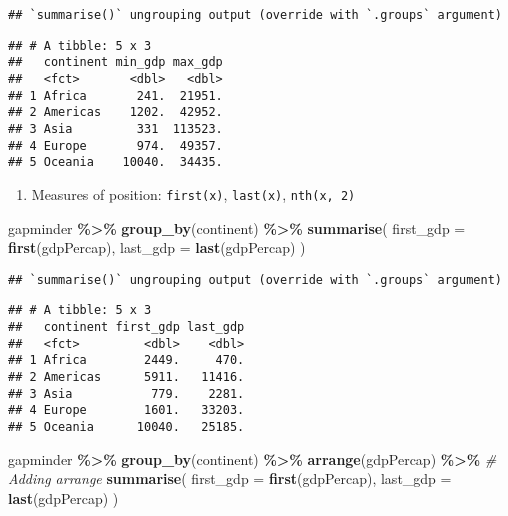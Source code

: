 \documentclass[
]{book}
\newenvironment{Shaded}{\begin{snugshade}}{\end{snugshade}}
\newcommand{\CommentTok}[1]{\textcolor[rgb]{0.56,0.35,0.01}{\textit{#1}}}
\newcommand{\DataTypeTok}[1]{\textcolor[rgb]{0.13,0.29,0.53}{#1}}
\newcommand{\KeywordTok}[1]{\textcolor[rgb]{0.13,0.29,0.53}{\textbf{#1}}}
\newcommand{\NormalTok}[1]{#1}
\newcommand{\OperatorTok}[1]{\textcolor[rgb]{0.81,0.36,0.00}{\textbf{#1}}}
\newcommand{\StringTok}[1]{\textcolor[rgb]{0.31,0.60,0.02}{#1}}
\providecommand{\tightlist}{%
  \setlength{\itemsep}{0pt}\setlength{\parskip}{0pt}}
\begin{document}
\begin{verbatim}
## `summarise()` ungrouping output (override with `.groups` argument)
\end{verbatim}

\begin{verbatim}
## # A tibble: 5 x 3
##   continent min_gdp max_gdp
##   <fct>       <dbl>   <dbl>
## 1 Africa       241.  21951.
## 2 Americas    1202.  42952.
## 3 Asia         331  113523.
## 4 Europe       974.  49357.
## 5 Oceania    10040.  34435.
\end{verbatim}

\begin{enumerate}
\def\labelenumi{\arabic{enumi}.}
\setcounter{enumi}{2}
\tightlist
\item
  Measures of position: \texttt{first(x)}, \texttt{last(x)}, \texttt{nth(x,\ 2)}
\end{enumerate}

\begin{Shaded}
\begin{Highlighting}[]
\NormalTok{gapminder }\OperatorTok{\%\textgreater{}\%}
\StringTok{  }\KeywordTok{group\_by}\NormalTok{(continent) }\OperatorTok{\%\textgreater{}\%}
\StringTok{  }\KeywordTok{summarise}\NormalTok{(}
    \DataTypeTok{first\_gdp =} \KeywordTok{first}\NormalTok{(gdpPercap),}
    \DataTypeTok{last\_gdp =} \KeywordTok{last}\NormalTok{(gdpPercap)}
\NormalTok{  )}
\end{Highlighting}
\end{Shaded}

\begin{verbatim}
## `summarise()` ungrouping output (override with `.groups` argument)
\end{verbatim}

\begin{verbatim}
## # A tibble: 5 x 3
##   continent first_gdp last_gdp
##   <fct>         <dbl>    <dbl>
## 1 Africa        2449.     470.
## 2 Americas      5911.   11416.
## 3 Asia           779.    2281.
## 4 Europe        1601.   33203.
## 5 Oceania      10040.   25185.
\end{verbatim}

\begin{Shaded}
\begin{Highlighting}[]
\NormalTok{gapminder }\OperatorTok{\%\textgreater{}\%}
\StringTok{  }\KeywordTok{group\_by}\NormalTok{(continent) }\OperatorTok{\%\textgreater{}\%}
\StringTok{  }\KeywordTok{arrange}\NormalTok{(gdpPercap) }\OperatorTok{\%\textgreater{}\%}\StringTok{ }\CommentTok{\# Adding arrange}
\StringTok{  }\KeywordTok{summarise}\NormalTok{(}
    \DataTypeTok{first\_gdp =} \KeywordTok{first}\NormalTok{(gdpPercap),}
    \DataTypeTok{last\_gdp =} \KeywordTok{last}\NormalTok{(gdpPercap)}
\NormalTok{  )}
\end{Highlighting}
\end{Shaded}
\end{document}
